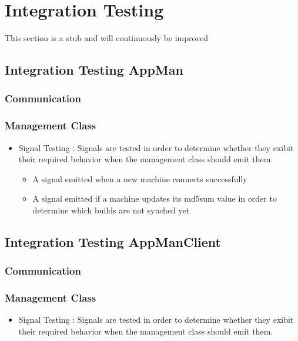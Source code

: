 \documentclass[a4paper,12pt,final]{article}
\begin{document}
\section{Integration Testing}
This section is a stub and will continuously be improved
\subsection{Integration Testing AppMan}
\subsubsection{Communication}

\subsubsection{Management Class}
\begin{itemize}
\item Signal Testing : Signals are tested in order to determine whether they exibit their required behavior when the management class should emit them.
\begin{itemize}
\item A signal emitted when a new machine connects successfully
\item A signal emitted if a machine updates its md5sum value in order to determine which builds are not synched yet
\end{itemize}
\end{itemize}







\subsection{Integration Testing AppManClient}

\subsubsection{Communication}

\subsubsection{Management Class}
\begin{itemize}
\item Signal Testing : Signals are tested in order to determine whether they exibit their required behavior when the management class should emit them.
\end{itemize}
\end{document}
